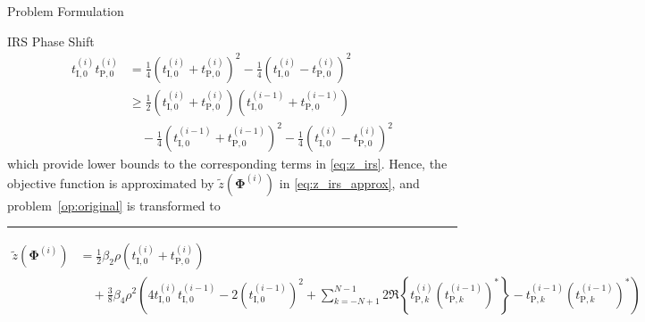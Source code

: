 \documentclass[journal]{IEEEtran}
\begin{document}
\begin{section}{Problem Formulation}
\begin{subsection}{IRS Phase Shift}
\begin{align}
				t_{\mathrm{I},0}^{(i)} t_{\mathrm{P},0}^{(i)}
				& = \frac{1}{4}(t_{\mathrm{I},0}^{(i)} + t_{\mathrm{P},0}^{(i)})^2 - \frac{1}{4}(t_{\mathrm{I},0}^{(i)} - t_{\mathrm{P},0}^{(i)})^2\nonumber\\
				& \ge \frac{1}{2}(t_{\mathrm{I},0}^{(i)} + t_{\mathrm{P},0}^{(i)})(t_{\mathrm{I},0}^{(i-1)} + t_{\mathrm{P},0}^{(i-1)})\nonumber\\
				& \quad - \frac{1}{4}(t_{\mathrm{I},0}^{(i-1)} + t_{\mathrm{P},0}^{(i-1)})^2 - \frac{1}{4}(t_{\mathrm{I},0}^{(i)} - t_{\mathrm{P},0}^{(i)})^2\label{eq:taylor_3}
			\end{align}
			which provide lower bounds to the corresponding terms in \eqref{eq:z_irs}. Hence, the objective function is approximated by $\tilde{z}(\boldsymbol{\Phi}^{(i)})$ in \eqref{eq:z_irs_approx}, and problem~\eqref{op:original} is transformed to
			\begin{figure*}[!b]
				\hrule
				\begin{align}
					\tilde{z}(\boldsymbol{\Phi}^{(i)})
					& = \frac{1}{2}{\beta_2}{\rho}(t_{\mathrm{I},0}^{(i)}+t_{\mathrm{P},0}^{(i)})\nonumber\\
					& \quad + \frac{3}{8}{\beta_4}{\rho^2} \left(4 t_{\mathrm{I},0}^{(i)}t_{\mathrm{I},0}^{(i-1)} - 2 (t_{\mathrm{I},0}^{(i-1)})^2 + \sum_{k=-N+1}^{N-1}{2 \Re\left\{t_{\mathrm{P},k}^{(i)} (t_{\mathrm{P},k}^{(i-1)})^*\right\} - t_{\mathrm{P},k}^{(i-1)} (t_{\mathrm{P},k}^{(i-1)})^*}\right)\nonumber\\

\end{align}
\end{figure*}
\end{subsection}
\end{section}
\end{document}
